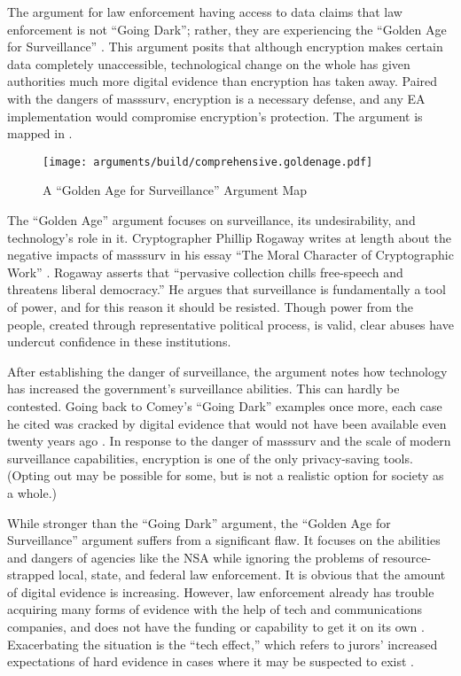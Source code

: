 
The argument for law enforcement having  access to data claims that law enforcement is not ``Going Dark'';
rather, they are experiencing the ``Golden Age for Surveillance'' \cite{swire_encryption_2011}. This argument posits
that although encryption makes certain data completely unaccessible, technological change on the whole has given
authorities much more digital evidence than encryption has taken away. Paired with the dangers of \ac{masssurv},
encryption is a necessary defense, and any \ac{EA} implementation would compromise encryption's protection. The argument
is mapped in .

\begin{figure}[p!]
  \centering\CaptionFontSize
  \texttt{[image: arguments/build/comprehensive.goldenage.pdf]}
  \caption{A ``Golden Age for Surveillance'' Argument Map}
  \label{fig-arg-golden-age}
\end{figure}

The ``Golden Age'' argument focuses on surveillance, its undesirability, and technology's role in it. Cryptographer
Phillip Rogaway writes at length about the negative impacts of \ac{masssurv} in his essay ``The Moral Character of
Cryptographic Work'' \cite{rogaway_moral_2015}. Rogaway asserts that ``pervasive collection  chills
free-speech and threatens liberal democracy.'' He argues that surveillance is fundamentally a tool of power, and for
this reason it should be resisted. Though power from the people, created through representative political process, is
valid, clear abuses have undercut confidence in these institutions.

After establishing the danger of surveillance, the argument notes how technology has increased the government's
surveillance abilities. This can hardly be contested. Going back to Comey's ``Going Dark'' examples once more, each case
he cited was cracked by digital evidence that would not have been available even twenty years ago \cite{comey_2014}. In
response to the danger of \ac{masssurv} and the scale of modern surveillance capabilities, encryption is one of the only
privacy-saving tools. (Opting out may be possible for some, but is not a realistic option for society as a whole.)

While stronger than the ``Going Dark'' argument, the ``Golden Age for Surveillance'' argument suffers from a significant
flaw. It focuses on the abilities and dangers of agencies like the \ac{NSA} while ignoring the problems of
resource-strapped local, state, and federal law enforcement. It is obvious that the amount of digital evidence is
increasing. However, law enforcement already has trouble acquiring many forms of evidence with the help of tech and
communications companies, and does not have the funding or capability to get it on its own \cite{carter_2018}.
Exacerbating the situation is the ``tech effect,'' which refers to jurors' increased expectations of hard evidence in cases
where it may be suspected to exist \cite{shelton_study_2006}.

